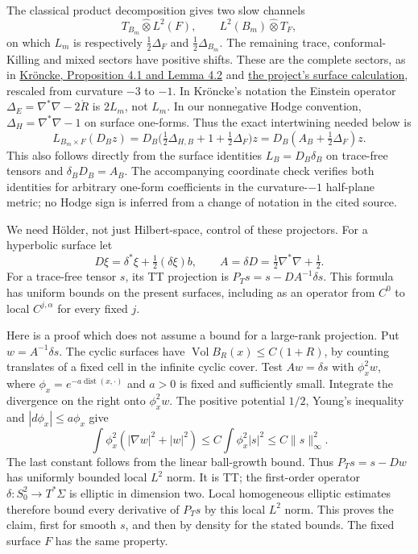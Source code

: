 \documentclass[
  11pt,
]{article}
\begin{document}
The classical product decomposition gives two slow channels \[
 T_{B_m}\widehat\otimes L^2(F),\qquad
 L^2(B_m)\widehat\otimes T_F,
\] on which \(L_m\) is respectively \(\tfrac12\Delta_F\) and
\(\tfrac12\Delta_{B_m}\). The remaining trace, conformal-Killing and
mixed sectors have positive shifts. These are the complete sectors, as
in \href{https://arxiv.org/html/1508.00721}{Kröncke, Proposition 4.1 and
Lemma 4.2} and
\href{../mathematics/current/round17_product_operator.md}{the project's
surface calculation}, rescaled from curvature \(-3\) to \(-1\). In
Kröncke's notation the Einstein operator
\(\Delta_E=\nabla^*\nabla-2\mathring R\) is \(2L_m\), not \(L_m\). In
our nonnegative Hodge convention, \(\Delta_H=\nabla^*\nabla-1\) on
surface one-forms. Thus the exact intertwining needed below is \[
 L_{B_m\times F}(D_Bz)
       =D_B\bigl(\tfrac12\Delta_{H,B}+1+\tfrac12\Delta_F\bigr)z
       =D_B(A_B+\tfrac12\Delta_F)z.
\] This also follows directly from the surface identities
\(L_B=D_B\delta_B\) on trace-free tensors and \(\delta_BD_B=A_B\). The
accompanying coordinate check verifies both identities for arbitrary
one-form coefficients in the curvature-\(-1\) half-plane metric; no
Hodge sign is inferred from a change of notation in the cited source.

We need Hölder, not just Hilbert-space, control of these projectors. For
a hyperbolic surface let \[
 D\xi=\delta^*\xi+\tfrac12(\delta\xi)b,
 \qquad A=\delta D=\tfrac12\nabla^*\nabla+\tfrac12.
\] For a trace-free tensor \(s\), its TT projection is
\(P_Ts=s-D A^{-1}\delta s\). This formula has uniform bounds on the
present surfaces, including as an operator from \(C^0\) to local
\(C^{j,\alpha}\) for every fixed \(j\).

Here is a proof which does not assume a bound for a large-rank
projection. Put \(w=A^{-1}\delta s\). The cyclic surfaces have
\(\operatorname{Vol}B_R(x)\le C(1+R)\), by counting translates of a
fixed cell in the infinite cyclic cover. Test \(Aw=\delta s\) with
\(\phi_x^2w\), where \(\phi_x=e^{-a\operatorname{dist}(x,\cdot)}\) and
\(a>0\) is fixed and sufficiently small. Integrate the divergence on the
right onto \(\phi_x^2w\). The positive potential \(1/2\), Young's
inequality and \(|d\phi_x|\le a\phi_x\) give \[
 \int\phi_x^2(|\nabla w|^2+|w|^2)
       \le C\int\phi_x^2|s|^2\le C\|s\|_\infty^2.        \tag{10}
\] The last constant follows from the linear ball-growth bound. Thus
\(P_Ts=s-Dw\) has uniformly bounded local \(L^2\) norm. It is TT; the
first-order operator \(\delta:S^2_0\to T^*\Sigma\) is elliptic in
dimension two. Local homogeneous elliptic estimates therefore bound
every derivative of \(P_Ts\) by this local \(L^2\) norm. This proves the
claim, first for smooth \(s\), and then by density for the stated
bounds. The fixed surface \(F\) has the same property.
\end{document}
